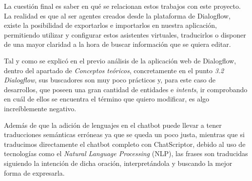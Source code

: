 La cuestión final es saber en qué se relacionan estos trabajos con este proyecto. La realidad es que al ser agentes creados desde la plataforma de Dialogflow, existe la posibilidad de exportarlos e importarlos en nuestra aplicación, permitiendo utilizar y configurar estos asistentes virtuales, traducirlos o disponer de una mayor claridad a la hora de buscar información que se quiera editar.

Tal y como se explicó en el previo análisis de la aplicación web de Dialogflow, dentro del apartado de \textit{Conceptos teóricos}, concretamente en el punto \textit{3.2 Dialogflow}, sus buscadores son muy poco prácticos y, para este caso de desarrollos, que poseen una gran cantidad de entidades e \textit{intents}, ir comprobando en cuál de ellos se encuentra el término que quiero modificar, es algo increíblemente negativo. 

Además de que la adición de lenguajes en el chatbot puede llevar a tener traducciones semánticas erróneas ya que se queda un poco justa, mientras que si traducimos directamente el chatbot completo con ChatScriptor, debido al uso de tecnologías como el \textit{Natural Language Processing} (NLP), las frases son traducidas siguiendo la intención de dicha oración, interpretándola y buscando la mejor forma de expresarla.